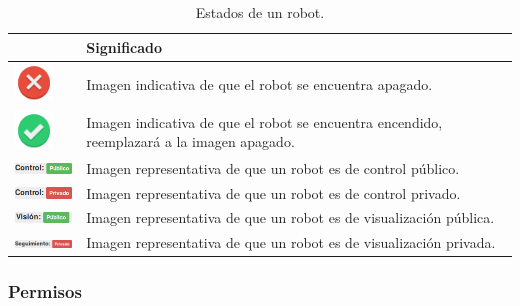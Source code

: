\begin{table}[H]
  \begin{center}
    \begin{tabular}{|p{2cm}|p{10cm}|}
      \hline
      \centering{Elemento} & \qquad \quad Significado \\
      \hline
      \includegraphics[width=1cm]{imagenes/manual-usuario/offline.png} & Imagen indicativa de que el robot se encuentra apagado. \\
      \hline
      \includegraphics[width=1cm]{imagenes/manual-usuario/online.png} & Imagen indicativa de que el robot se encuentra encendido, reemplazará a la imagen apagado. \\
      \hline
      \includegraphics[width=2cm]{imagenes/manual-usuario/control-publico.png} & Imagen representativa de que un robot es de control público. \\
      \hline
      \includegraphics[width=2cm]{imagenes/manual-usuario/control-privado.png} & Imagen representativa de que un robot es de control privado. \\
      \hline
      \includegraphics[width=2cm]{imagenes/manual-usuario/vision-publico.png} & Imagen representativa de que un robot es de visualización pública. \\
      \hline
      \includegraphics[width=2.2cm]{imagenes/manual-usuario/seguimiento-privado.png} & Imagen representativa de que un robot es de visualización privada. \\
      \hline
    \end{tabular}
  \end{center}
\caption{Estados de un robot.}
\end{table}


\subsubsection{Permisos}


